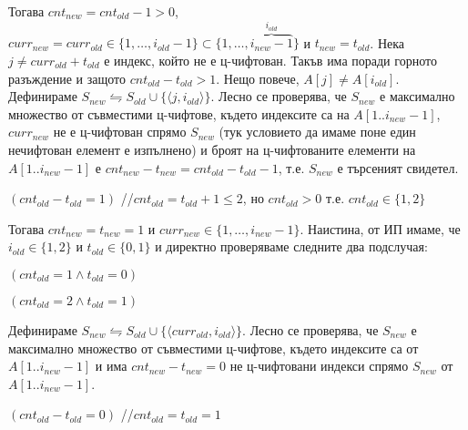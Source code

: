 \begin{solution}
\begin{maintenance}
\begin{mycase}
\begin{mycase}
				\vspace{-0.35cm}
				Тогава $cnt_{new}=cnt_{old}-1>0$, $curr_{new}=curr_{old}\in\{1,\dots,i_{old}-1\}\subset\{1,\dots,\overbrace{i_{new}-1}^{i_{old}}\}$ и $t_{new}=t_{old}$. Нека $j\ne curr_{old}+t_{old}$ е индекс, който не е ц-чифтован. Такъв има поради горното разъждение и защото $cnt_{old}-t_{old}>1$. Нещо повече, $A[j]\ne A[i_{old}]$. Дефинираме $S_{new}\leftrightharpoons S_{old}\cup\{\langle j,i_{old}\rangle\}$. Лесно се проверява, че $S_{new}$ е максимално множество от съвместими ц-чифтове, където индексите са на $A[1..i_{new}-1]$, $curr_{new}$ не е ц-чифтован спрямо $S_{new}$ (тук условието да имаме поне един нечифтован елемент е изпълнено) и броят на ц-чифтованите елементи на $A[1..i_{new}-1]$ е $cnt_{new}-t_{new}=cnt_{old}-t_{old}-1$, т.е. $S_{new}$ е търсеният свидетел.
				
				\item $(cnt_{old}-t_{old}=1)$ //$cnt_{old}=t_{old}+1\le2$, но $cnt_{old}>0$ т.е. $cnt_{old}\in\{1,2\}$
				
				Тогава $cnt_{new}=t_{new}=1$ и $curr_{new}\in\{1,\dots,i_{new}-1\}$. Наистина, от ИП имаме, че $i_{old}\in\{1,2\}$ и $t_{old}\in\{0,1\}$ и директно проверяваме следните два подслучая:
				\begin{mycase}
					\item $(cnt_{old}=1\land t_{old}=0)$
					\item $(cnt_{old}=2\land t_{old}=1)$
				\end{mycase}
				Дефинираме $S_{new}\leftrightharpoons S_{old}\cup\{\langle curr_{old},i_{old}\rangle\}$. Лесно се проверява, че $S_{new}$ е максимално множество от съвместими ц-чифтове, където индексите са от $A[1..i_{new}-1]$ и има $cnt_{new}-t_{new}=0$ не ц-чифтовани индекси спрямо $S_{new}$ от $A[1..i_{new}-1]$.
				
				\item $(cnt_{old}-t_{old}=0)$ //$cnt_{old}=t_{old}=1$
				

\end{mycase}
\end{mycase}
\end{maintenance}
\end{solution}
